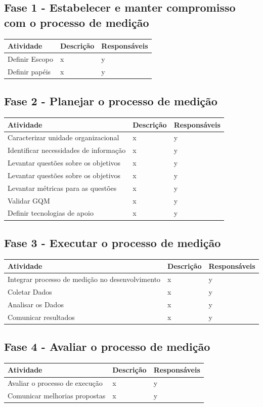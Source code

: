 \subsection{Fase 1 - Estabelecer e manter compromisso com o processo de medição}
	\begin{tabular}{ |p{4cm}|p{6cm}| p{3cm} |}
	 \hline
	 Atividade 		& 		Descrição & Responsáveis \\
	 \hline
	 	Definir Escopo & x &  y \\
	 \hline
	 	Definir papéis & x &  y \\
	 \hline
	\end{tabular}


\subsection{Fase 2 - Planejar o processo de medição}

	\begin{tabular}{ |p{4cm}|p{6cm}| p{3cm} |}
	 \hline
	 Atividade 		& 		Descrição & Responsáveis \\
	 \hline
	 	Caracterizar unidade organizacional & x &  y \\
	 \hline
	 	Identificar necessidades de informação & x &  y \\
	 \hline
	 	Levantar questões sobre os objetivos & x &  y \\
	 \hline
	 	Levantar questões sobre os objetivos & x &  y \\
	 \hline
	 Levantar métricas para as questões & x &  y \\
	 \hline
	 Validar GQM & x &  y \\
	 \hline
	 Definir tecnologias de apoio & x &  y \\
	 \hline
	\end{tabular}

\subsection{Fase 3 - Executar o processo de medição}

	\begin{tabular}{ |p{4cm}|p{6cm}| p{3cm} |}
	 \hline
	 Atividade 		& 		Descrição & Responsáveis \\
	 \hline
	 	Integrar processo de medição no desenvolvimento & x &  y \\
	 \hline
	 	Coletar Dados & x &  y \\
	 \hline
	 	Analisar os Dados & x &  y \\
	 \hline
	 	Comunicar resultados & x &  y \\
	 \hline
	\end{tabular}

\subsection{Fase 4 - Avaliar o processo de medição}

	\begin{tabular}{ |p{4cm}|p{6cm}| p{3cm} |}

	 \hline
	 Atividade 		& 		Descrição & Responsáveis \\
	 \hline
	 	Avaliar o processo de execução & x &  y \\
	 \hline
	 	Comunicar melhorias propostas & x &  y \\
	 \hline

	\end{tabular}
